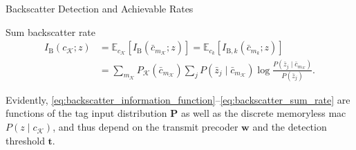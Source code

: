 \documentclass[journal]{IEEEtran}
\begin{document}
\begin{section}{Backscatter Detection and Achievable Rates}
\begin{subsection}{Sum backscatter rate}
\begin{subequations}
				\begin{align}
					I_{\mathrm{B}}(c_{\mathcal{K}};z)
					& = \mathbb{E}_{c_{\mathcal{K}}} \left[I_{\mathrm{B}}(\bar{c}_{m_{\mathcal{K}}};z)\right] = \mathbb{E}_{c_k} \left[I_{\mathrm{B},k}(\bar{c}_{m_k};z)\right]\label{eq:backscatter_sum_rate_expectation}\\
					& = \sum_{m_{\mathcal{K}}} P_{\mathcal{K}}(\bar{c}_{m_{\mathcal{K}}}) \sum_j P(\bar{z}_j \mid \bar{c}_{m_{\mathcal{K}}}) \log \frac{P(\bar{z}_j \mid \bar{c}_{m_{\mathcal{K}}})}{P(\bar{z}_j)}.\label{eq:backscatter_sum_rate_expansion}
				\end{align}
				\label{eq:backscatter_sum_rate}
			\end{subequations}

			Evidently, \eqref{eq:backscatter_information_function}--\eqref{eq:backscatter_sum_rate} are functions of the tag input distribution $\boldsymbol{P}$ as well as the discrete memoryless \gls{mac} $P(z \mid c_{\mathcal{K}})$, and thus depend on the transmit precoder $\boldsymbol{w}$ and the detection threshold $\boldsymbol{t}$.
		\end{subsection}


\end{section}
\end{document}
